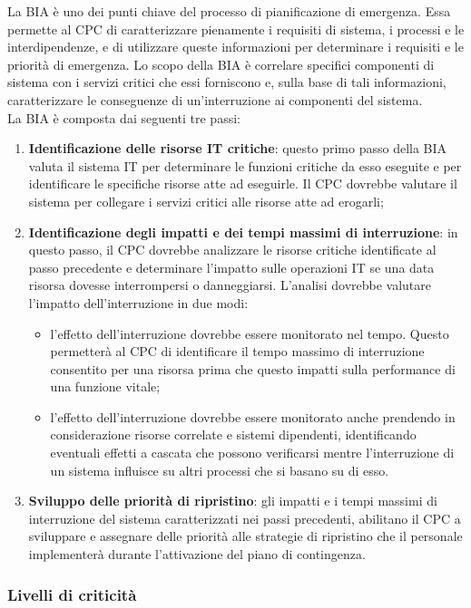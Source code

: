\documentclass[12pt, a4paper, titlepage]{report}
\begin{document}
		La BIA è uno dei punti chiave
		del processo di pianificazione di emergenza. Essa
		permette al CPC di caratterizzare pienamente i requisiti
		di sistema, i processi e le interdipendenze, e di utilizzare queste informazioni per determinare i requisiti e le priorità di emergenza. Lo scopo della BIA è correlare specifici componenti di sistema con i servizi critici che essi forniscono e, sulla base di tali informazioni, caratterizzare le conseguenze di un'interruzione ai componenti del sistema.\\
		La BIA è composta dai seguenti tre passi:
		\begin{enumerate}
			\item \textbf{Identificazione delle risorse IT critiche}:  questo primo passo della BIA valuta il sistema IT per determinare le funzioni critiche da esso eseguite e per identificare le specifiche risorse atte ad eseguirle. Il CPC dovrebbe valutare il sistema per collegare i servizi critici alle risorse atte ad erogarli;
			\item \textbf{Identificazione degli impatti e dei tempi massimi di interruzione}: in questo passo, il CPC dovrebbe analizzare le risorse critiche identificate al passo precedente e determinare l'impatto sulle operazioni IT se una data risorsa dovesse interrompersi o danneggiarsi. L'analisi dovrebbe valutare l'impatto dell'interruzione in due modi:
			\begin{itemize}
				\item l'effetto dell'interruzione dovrebbe essere monitorato nel tempo. Questo permetterà al CPC di identificare il tempo massimo di interruzione consentito per una risorsa prima che questo impatti sulla performance di una funzione vitale;
				\item l'effetto dell'interruzione dovrebbe essere monitorato anche prendendo in considerazione risorse correlate e sistemi dipendenti, identificando eventuali effetti a cascata che possono verificarsi mentre l'interruzione di un sistema influisce su altri processi che si basano su di esso.
			\end{itemize}
			\item \textbf{Sviluppo delle priorità di ripristino}: gli impatti e i tempi massimi di interruzione del sistema caratterizzati nei passi precedenti, abilitano il CPC a sviluppare e assegnare delle priorità alle strategie di ripristino che il personale implementerà durante l'attivazione del piano di contingenza.
		\end{enumerate}
		
		\subsubsection{Livelli di criticità}
		
\end{document}
